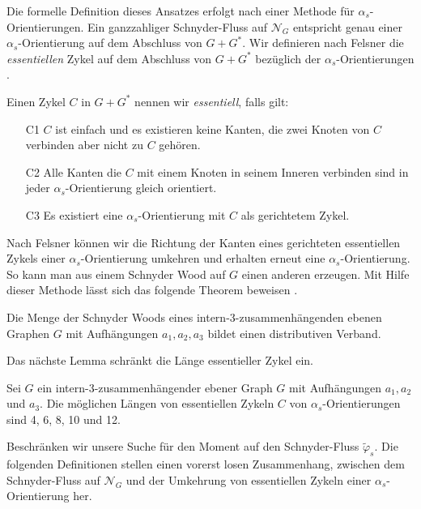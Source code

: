 Die formelle Definition dieses Ansatzes erfolgt nach einer Methode für $\alpha_s$-Orient\-ier\-ung\-en. Ein ganzzahliger Schnyder-Fluss auf $\mathcal{N}_G$ entspricht genau einer $\alpha_s$-Orientierung auf dem Abschluss von $G+G^*$. Wir definieren nach Felsner die \textit{essentiellen} Zykel auf dem Abschluss von $G+G^*$ bezüglich der $\alpha_s$-Orientierungen \cite{felsner04}.

\begin{definition}
Einen Zykel $C$ in $G+G^*$ nennen wir \textit{essentiell}, falls gilt:
\begin{itemize}
\item[C1] $C$ ist einfach und es existieren keine Kanten, die zwei Knoten von $C$ verbinden aber nicht zu $C$ gehören.
\item[C2] Alle Kanten die $C$ mit einem Knoten in seinem Inneren verbinden sind in jeder $\alpha_s$-Orientierung gleich orientiert.
\item[C3] Es existiert eine $\alpha_s$-Orientierung mit $C$ als gerichtetem Zykel.
\end{itemize}
\end{definition}

Nach Felsner können wir die Richtung der Kanten eines gerichteten essentiellen Zykels einer $\alpha_s$-Orientierung umkehren und erhalten erneut eine $\alpha_s$-Orientierung. So kann man aus einem Schnyder Wood auf $G$ einen anderen erzeugen. Mit Hilfe dieser Methode lässt sich das folgende Theorem beweisen \cite{felsner04}.
 
\begin{theorem}
Die Menge der Schnyder Woods eines intern-3-zusammenhängenden ebenen Graphen $G$ mit Aufhängungen $a_1,a_2,a_3$ bildet einen distributiven Verband.
\end{theorem}

Das nächste Lemma schränkt die Länge essentieller Zykel ein.

\begin{lemma}
Sei $G$ ein intern-3-zusammenhängender ebener Graph $G$ mit Aufhängungen $a_1,a_2$ und $a_3$. Die möglichen Längen von essentiellen Zykeln $C$ von $\alpha_s$-Orientierungen sind 4, 6, 8, 10 und 12.
\end{lemma}

Beschränken wir unsere Suche für den Moment auf den Schnyder-Fluss $\tilde{\varphi}_s$. Die folgenden Definitionen stellen einen vorerst losen Zusammenhang, zwischen dem Schnyder-Fluss auf $\mathcal{N}_G$ und der Umkehrung von essentiellen Zykeln einer $\alpha_s$-Orientierung her.

